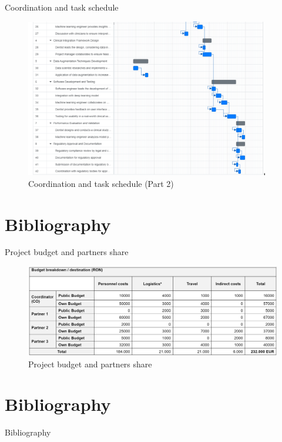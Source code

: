 \documentclass{beamer}
\begin{document}
\begin{frame}{Coordination and task schedule}

  \begin{figure}
    \includegraphics[width = 0.95\textwidth]{fig/tasks2.png}
    \caption{Coordination and task schedule (Part 2)}
  \end{figure}

\end{frame}

\section{Bibliography}

\begin{frame}{Project budget and partners share}

  \begin{figure}
    \includegraphics[width = 1.02\textwidth]{fig/budget.png}
    \caption{Project budget and partners share}
  \end{figure}

\end{frame}

\section{Bibliography}

\begin{frame}[allowframebreaks]{Bibliography}

  
  

\end{frame}
\end{document}

